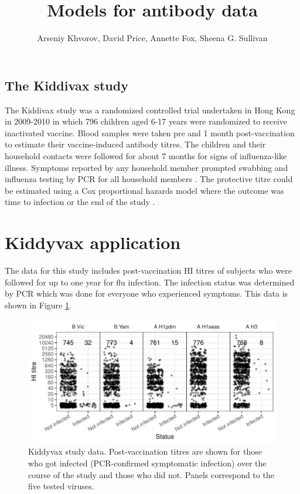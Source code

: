 \documentclass[12pt]{article}
\title{Models for antibody data}
\author{Arseniy Khvorov, David Price, Annette Fox, Sheena G. Sullivan}
\begin{document}
\maketitle


\subsection{The Kiddivax study}

The Kiddivax study was a randomized controlled trial undertaken in Hong Kong in 2009-2010 in which 796 children aged 6-17 years were randomized to receive inactivated vaccine. Blood samples were taken pre and 1 month post-vaccination to estimate their vaccine-induced antibody titres.  The children and their household contacts were followed for about 7 months for signs of influenza-like illness. Symptoms reported by any household member prompted swabbing and influenza testing by PCR for all household members \citep{Cowling;2013}. The protective titre could be estimated using a Cox proportional hazards model where the outcome was time to infection or the end of the study \citep{Ng;2013}.

\section{Kiddyvax application}

The data for this study includes post-vaccination HI titres of subjects who were followed for up to one year for flu infection. The infection status was determined by PCR which was done for everyone who experienced symptoms. This data is shown in Figure \ref{fig:kiddyvax-main-titre}.

\begin{figure}[htp]
	\centering
	\includegraphics[width=1\textwidth]{../data-plot/kiddyvax-main-titre.pdf}
	\caption{
	Kiddyvax study data. Post-vaccination titres are shown for those who got infected (PCR-confirmed symptomatic infection) over the course of the study and those who did not. Panels correspond to the five tested viruses.
	}
	\label{fig:kiddyvax-main-titre}
\end{figure}
\end{document}
